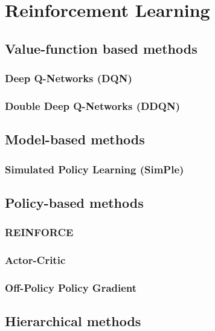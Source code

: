 \documentclass{article}
\begin{document}
\section{Reinforcement Learning}

\subsection{Value-function based methods}

\subsubsection{Deep Q-Networks (DQN)}

\subsubsection{Double Deep Q-Networks (DDQN)}

\subsection{Model-based methods}

\subsubsection{Simulated Policy Learning (SimPle)}

\subsection{Policy-based methods}

\subsubsection{REINFORCE}

\subsubsection{Actor-Critic}

\subsubsection{Off-Policy Policy Gradient}

\subsection{Hierarchical methods}
\end{document}
